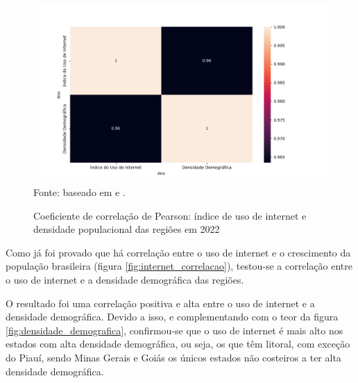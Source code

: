 \begin{figure}[H]
    \centering
    \caption{Coeficiente de correlação de Pearson: índice de uso de internet e densidade populacional das regiões em 2022}
    \includegraphics[width=1\linewidth]{figuras/internet/correlacao2.png}
    \label{fig:correlacao2}
    \footnotesize{Fonte: baseado em \cite{IBGE_censo_2022} e \cite{pnda_continua_anual_2016_2023}.}
\end{figure}

Como já foi provado que há correlação entre o uso de internet e o crescimento da população brasileira (figura \ref{fig:internet_correlacao}), testou-se a correlação entre o uso de internet e a densidade demográfica das regiões.

O resultado foi uma correlação positiva e alta entre o uso de internet e a densidade demográfica. Devido a isso, e complementando com o teor da figura \ref{fig:densidade_demografica}, confirmou-se que o uso de internet é mais alto nos estados com alta densidade demográfica, ou seja, os que têm litoral, com exceção do Piauí, sendo Minas Gerais e Goiás os únicos estados não costeiros a ter alta densidade demográfica.

